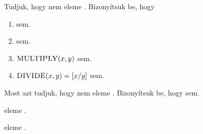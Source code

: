 \begin{Exercise}[counter={sorszam}, difficulty=0]
Tudjuk, hogy  nem eleme \ACnull. Bizonyítsuk be, hogy
\begin{enumerate}
 \item {} sem.
 \item {} sem.
 \item $\mbox{\sc{MULTIPLY}}(x,y)$ sem.
 \item $\mbox{\sc{DIVIDE}}(x,y)=[x/y]$ sem.
\end{enumerate}
\end{Exercise}


\begin{Exercise}[counter={sorszam}, difficulty=0]
Most azt tudjuk, hogy  nem eleme \ACnull. Bizonyítsuk be, hogy  sem.
\end{Exercise}


\begin{Exercise}[counter={sorszam}, difficulty=0]
 eleme .
\end{Exercise}


\begin{Exercise}[counter={sorszam}, difficulty=2]
 eleme .
\end{Exercise}


